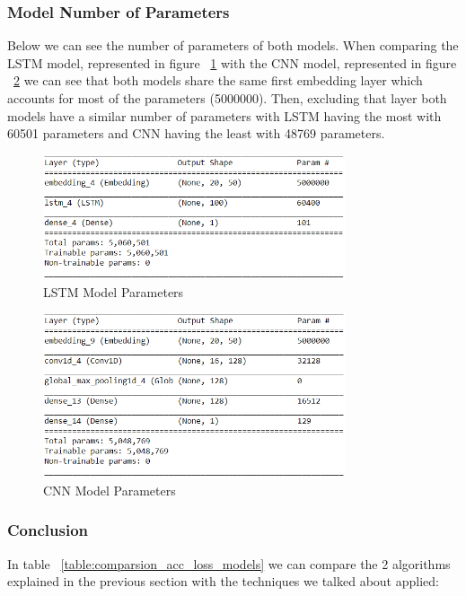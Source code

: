 \documentclass[conference]{IEEEtran}
\begin{document}
\subsubsection{Model Number of Parameters}

Below we can see the number of parameters of both models.
\linebreak When comparing the LSTM model, represented in figure ~\ref{fig:model1_parameters} with the CNN model, represented in figure ~\ref{fig:model2_parameters} we can see that both models share the same first embedding layer which accounts for most of the parameters (5000000). Then, excluding that layer both models have a similar number of parameters with LSTM having the most with 60501 parameters and CNN having the least with 48769 parameters.

\begin{figure}[H]
    \centering
    \includegraphics[width=3.5in]{pictures/model1_parameters.png}
    \caption{LSTM Model Parameters}\label{fig:model1_parameters}
\end{figure}

\begin{figure}[H]
    \centering
    \includegraphics[width=3.5in]{pictures/model2_parameters.png}
    \caption{CNN Model Parameters}\label{fig:model2_parameters}
\end{figure}

\subsubsection{Conclusion}

In table ~\ref{table:comparsion_acc_loss_models} we can compare the 2 algorithms explained in the previous section with the techniques we talked about applied:
\end{document}
